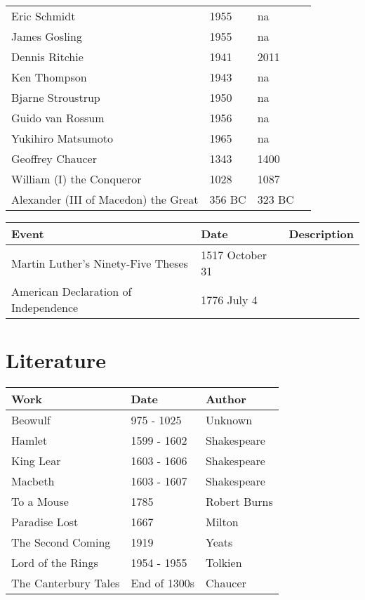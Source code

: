 \documentclass{article}
\begin{document}
\begin{table}[H]
\begin{tabularx}{\textwidth}{ X X X X }
		Eric Schmidt & 1955 & na & \\
		James Gosling & 1955 & na & \\
		Dennis Ritchie & 1941 & 2011 & \\
		Ken Thompson & 1943 & na & \\
		Bjarne Stroustrup & 1950 & na & \\
		Guido van Rossum & 1956 & na & \\
		Yukihiro Matsumoto & 1965 & na & \\
		Geoffrey Chaucer & 1343 & 1400 & \\
		William (I) the Conqueror & 1028 & 1087 & \\
		Alexander (III of Macedon) the Great & 356 BC & 323 BC & \\
	\end{tabularx}
\end{table}
\begin{table}[H]
	\centering
	\begin{tabularx}{\textwidth}{ X X X }
		Event & Date & Description \\
		\hline
		Martin Luther's Ninety-Five Theses & 1517 October 31 & \\
		American Declaration of Independence & 1776 July 4 & \\
	\end{tabularx}
\end{table}

\section{Literature}
\begin{table}[H]
	\centering
	\begin{tabularx}{\textwidth}{ X X X }
		Work & Date & Author \\
		\hline
		Beowulf & 975 - 1025 & Unknown \\
		Hamlet & 1599 - 1602 & Shakespeare \\
		King Lear & 1603 - 1606 & Shakespeare \\
		Macbeth & 1603 - 1607 & Shakespeare \\
		To a Mouse & 1785 & Robert Burns \\
		Paradise Lost & 1667 & Milton \\
		The Second Coming & 1919 & Yeats \\
		Lord of the Rings & 1954 - 1955 & Tolkien \\
		The Canterbury Tales & End of 1300s & Chaucer \\
	\end{tabularx}
\end{table}
\end{document}
